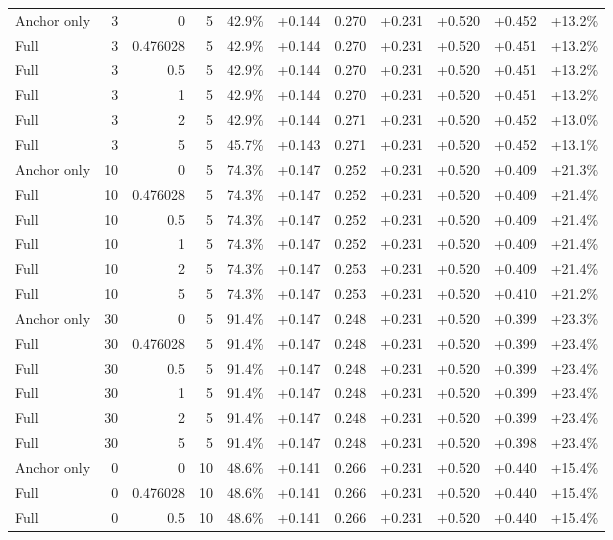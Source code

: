 \begin{table}[htbp]
\begin{tabular}{lrrrccccccc}
Anchor only & 3 & 0 & 5 & 42.9\% & +0.144 & 0.270 & +0.231 & +0.520 & +0.452 & +13.2\% \\
Full & 3 & 0.476028 & 5 & 42.9\% & +0.144 & 0.270 & +0.231 & +0.520 & +0.451 & +13.2\% \\
Full & 3 & 0.5 & 5 & 42.9\% & +0.144 & 0.270 & +0.231 & +0.520 & +0.451 & +13.2\% \\
Full & 3 & 1 & 5 & 42.9\% & +0.144 & 0.270 & +0.231 & +0.520 & +0.451 & +13.2\% \\
Full & 3 & 2 & 5 & 42.9\% & +0.144 & 0.271 & +0.231 & +0.520 & +0.452 & +13.0\% \\
Full & 3 & 5 & 5 & 45.7\% & +0.143 & 0.271 & +0.231 & +0.520 & +0.452 & +13.1\% \\
Anchor only & 10 & 0 & 5 & 74.3\% & +0.147 & 0.252 & +0.231 & +0.520 & +0.409 & +21.3\% \\
Full & 10 & 0.476028 & 5 & 74.3\% & +0.147 & 0.252 & +0.231 & +0.520 & +0.409 & +21.4\% \\
Full & 10 & 0.5 & 5 & 74.3\% & +0.147 & 0.252 & +0.231 & +0.520 & +0.409 & +21.4\% \\
Full & 10 & 1 & 5 & 74.3\% & +0.147 & 0.252 & +0.231 & +0.520 & +0.409 & +21.4\% \\
Full & 10 & 2 & 5 & 74.3\% & +0.147 & 0.253 & +0.231 & +0.520 & +0.409 & +21.4\% \\
Full & 10 & 5 & 5 & 74.3\% & +0.147 & 0.253 & +0.231 & +0.520 & +0.410 & +21.2\% \\
Anchor only & 30 & 0 & 5 & 91.4\% & +0.147 & 0.248 & +0.231 & +0.520 & +0.399 & +23.3\% \\
Full & 30 & 0.476028 & 5 & 91.4\% & +0.147 & 0.248 & +0.231 & +0.520 & +0.399 & +23.4\% \\
Full & 30 & 0.5 & 5 & 91.4\% & +0.147 & 0.248 & +0.231 & +0.520 & +0.399 & +23.4\% \\
Full & 30 & 1 & 5 & 91.4\% & +0.147 & 0.248 & +0.231 & +0.520 & +0.399 & +23.4\% \\
Full & 30 & 2 & 5 & 91.4\% & +0.147 & 0.248 & +0.231 & +0.520 & +0.399 & +23.4\% \\
Full & 30 & 5 & 5 & 91.4\% & +0.147 & 0.248 & +0.231 & +0.520 & +0.398 & +23.4\% \\
Anchor only & 0 & 0 & 10 & 48.6\% & +0.141 & 0.266 & +0.231 & +0.520 & +0.440 & +15.4\% \\
Full & 0 & 0.476028 & 10 & 48.6\% & +0.141 & 0.266 & +0.231 & +0.520 & +0.440 & +15.4\% \\
Full & 0 & 0.5 & 10 & 48.6\% & +0.141 & 0.266 & +0.231 & +0.520 & +0.440 & +15.4\% \\

\end{tabular}
\end{table}
